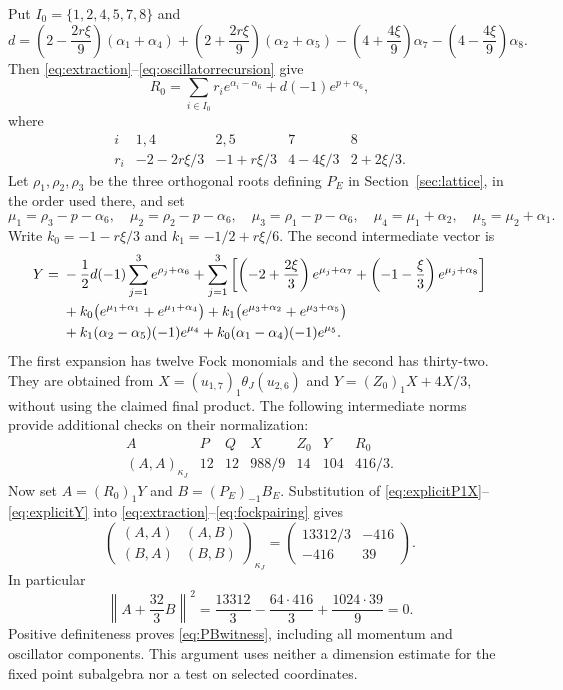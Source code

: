 \documentclass[11pt,reqno]{amsart}
\theoremstyle{definition}\newtheorem{definition}[theorem]{Definition}
\theoremstyle{remark}\newtheorem{remark}[theorem]{Remark}
\numberwithin{equation}{section}
\begin{document}
Put $I_0=\{1,2,4,5,7,8\}$ and
\[
 d=\left(2-\frac{2r\xi}{9}\right)(\alpha_1+\alpha_4)
 +\left(2+\frac{2r\xi}{9}\right)(\alpha_2+\alpha_5)
 -\left(4+\frac{4\xi}{9}\right)\alpha_7
 -\left(4-\frac{4\xi}{9}\right)\alpha_8.
\]
Then \eqref{eq:extraction}--\eqref{eq:oscillatorrecursion} give
\begin{equation}\label{eq:explicitP1X}
 R_0=\sum_{i\in I_0}r_i e^{\alpha_i-\alpha_6}+d(-1)e^{p+\alpha_6},
\end{equation}
where
\[
\begin{array}{c|cccc}
 i&1,4&2,5&7&8\\\hline
 r_i&-2-2r\xi/3&-1+r\xi/3&4-4\xi/3&2+2\xi/3.
\end{array}
\]
Let $\rho_1,\rho_2,\rho_3$ be the three orthogonal roots defining $P_E$ in Section~\ref{sec:lattice}, in the order used there, and set
\[
 \mu_1=\rho_3-p-\alpha_6,\quad
 \mu_2=\rho_2-p-\alpha_6,\quad
 \mu_3=\rho_1-p-\alpha_6,
 \quad\mu_4=\mu_1+\alpha_2,\quad\mu_5=\mu_2+\alpha_1.
\]
Write $k_0=-1-r\xi/3$ and $k_1=-1/2+r\xi/6$. The second intermediate vector is
\begin{align}\label{eq:explicitY}
 Y={}&-\frac12d(-1)\sum_{j=1}^3e^{\rho_j+\alpha_6}
 +\sum_{j=1}^3\left[\left(-2+\frac{2\xi}{3}\right)e^{\mu_j+\alpha_7}
                  +\left(-1-\frac\xi3\right)e^{\mu_j+\alpha_8}\right]\notag\\
 &+k_0\bigl(e^{\mu_1+\alpha_1}+e^{\mu_1+\alpha_4}\bigr)
  +k_1\bigl(e^{\mu_3+\alpha_2}+e^{\mu_3+\alpha_5}\bigr)\notag\\
 &+k_1(\alpha_2-\alpha_5)(-1)e^{\mu_4}
  +k_0(\alpha_1-\alpha_4)(-1)e^{\mu_5}.
\end{align}
The first expansion has twelve Fock monomials and the second has thirty-two. They are obtained from $X=(u_{1,7})_1\theta_J(u_{2,6})$ and $Y=(Z_0)_1X+4X/3$, without using the claimed final product. The following intermediate norms provide additional checks on their normalization:
\[
\begin{array}{c|rrrrrr}
 A&P&Q&X&Z_0&Y&R_0\\\hline
 (A,A)_{\kappa_J}&12&12&988/9&14&104&416/3.
\end{array}
\]
Now set $A=(R_0)_1Y$ and $B=(P_E)_{-1}B_E$. Substitution of \eqref{eq:explicitP1X}--\eqref{eq:explicitY} into \eqref{eq:extraction}--\eqref{eq:fockpairing} gives
\begin{equation}\label{eq:nestedgram}
 \begin{pmatrix}(A,A)&(A,B)\\(B,A)&(B,B)\end{pmatrix}_{\kappa_J}
 =\begin{pmatrix}13312/3&-416\\-416&39\end{pmatrix}.
\end{equation}
In particular
\[
 \left\|A+\frac{32}{3}B\right\|^2
 =\frac{13312}{3}-\frac{64\cdot416}{3}
       +\frac{1024\cdot39}{9}=0.
\]
Positive definiteness proves \eqref{eq:PBwitness}, including all momentum and oscillator components. This argument uses neither a dimension estimate for the fixed point subalgebra nor a test on selected coordinates.
\end{document}
